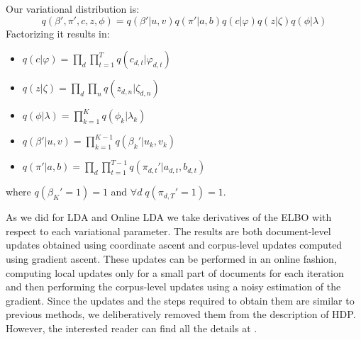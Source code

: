 Our variational distribution is:
\begin{equation*}
    q(\beta', \pi', c, z, \phi) = q(\beta' | u, v) q(\pi' | a, b) q(c | \varphi) q(z | \zeta) q(\phi | \lambda)
\end{equation*}
Factorizing it results in:
\begin{itemize}
    \item $q(c | \varphi) = \prod_d \prod_{t=1}^T q(c_{d,t} | \varphi_{d,t})$
    \item $q(z | \zeta) = \prod_d \prod_n q(z_{d,n} | \zeta_{d,n})$
    \item $q(\phi | \lambda) = \prod_{k=1}^{K} q(\phi_k | \lambda_k)$
    \item $q(\beta' | u, v) = \prod_{k=1}^{K-1} q(\beta_k' | u_k, v_k)$
    \item $q(\pi' | a, b) = \prod_d \prod_{t=1}^{T-1} q(\pi_{d,t}' | a_{d,t}, b_{d,t})$
\end{itemize}
where $q(\beta_K' = 1) = 1$ and $\forall d \; q(\pi_{d,T}' = 1) = 1$.

As we did for LDA and Online LDA we take derivatives of the ELBO
with respect to each variational parameter.
The results are both document-level updates obtained using coordinate ascent
and corpus-level updates computed using gradient ascent.
These updates can be performed in an online fashion,
computing local updates only for a small part of documents
for each iteration and then performing the corpus-level updates using a noisy estimation
of the gradient.
Since the updates and the steps required to obtain them are similar to previous methods,
we deliberatively removed them from the description of HDP. However, the interested reader can
find all the details at \cite{DBLP:journals/jmlr/WangPB11}.